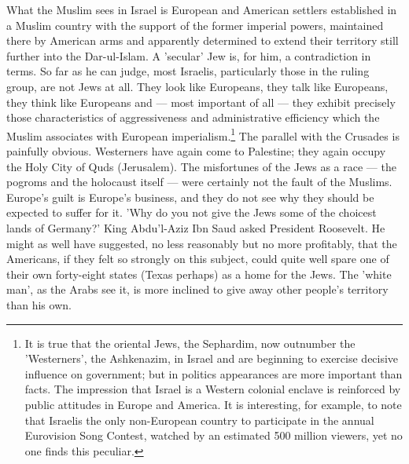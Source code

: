 \documentclass[11pt, b5paper, twoside]{book}
\begin{document}
What the Muslim sees in Israel is European and American settlers established in a Muslim country with the support of the former imperial powers, maintained there by American arms and apparently determined to extend their territory still further into the Dar-ul-Islam. A 'secular' Jew is, for him, a contradiction in terms. So far as he can judge, most Israelis, particularly those in the ruling group, are not Jews at all. They look like Europeans, they talk like Europeans, they think like Europeans and --- most important of all --- they exhibit precisely those characteristics of aggressiveness and administrative efficiency which the Muslim associates with European imperialism.\footnote{It is true that the oriental Jews, the Sephardim, now outnumber the 'Westerners', the Ashkenazim, in Israel and are beginning to exercise decisive influence on government; but in politics appearances are more important than facts. The impression that Israel is a Western colonial enclave is reinforced by public attitudes in Europe and America. It is interesting, for example, to note that Israelis the only non-European country to participate in the annual Eurovision Song Contest, watched by an estimated 500 million viewers, yet no one finds this peculiar.} The parallel with the Crusades is painfully obvious. Westerners have again come to Palestine; they again occupy the Holy City of Quds (Jerusalem). The misfortunes of the Jews as a race --- the pogroms and the holocaust itself --- were certainly not the fault of the Muslims. Europe's guilt is Europe's business, and they do not see why they should be expected to suffer for it. 'Why do you not give the Jews some of the choicest lands of Germany?' King Abdu'l-Aziz Ibn Saud asked President Roosevelt. He might as well have suggested, no less reasonably but no more profitably, that the Americans, if they felt so strongly on this subject, could quite well spare one of their own forty-eight states (Texas perhaps) as a home for the Jews. The 'white man', as the Arabs see it, is more inclined to give away other people's territory than his own. \\
\end{document}
